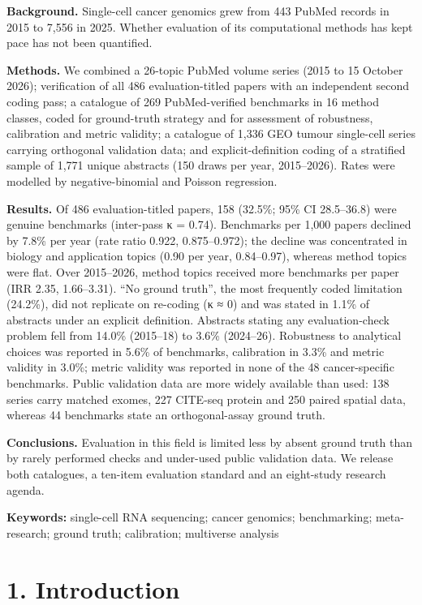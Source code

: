 \documentclass[11pt]{article}
\begin{document}
\textbf{Background.} Single-cell cancer genomics grew from 443 PubMed
records in 2015 to 7,556 in 2025. Whether evaluation of its
computational methods has kept pace has not been quantified.

\textbf{Methods.} We combined a 26-topic PubMed volume series (2015 to
15 October 2026); verification of all 486 evaluation-titled papers with
an independent second coding pass; a catalogue of 269 PubMed-verified
benchmarks in 16 method classes, coded for ground-truth strategy and for
assessment of robustness, calibration and metric validity; a
catalogue of 1,336 GEO tumour single-cell series carrying orthogonal
validation data; and explicit-definition coding of a stratified sample of 1,771 unique abstracts (150 draws per year, 2015--2026). Rates were modelled by
negative-binomial and Poisson regression.

\textbf{Results.} Of 486 evaluation-titled papers, 158 (32.5\%; 95\% CI
28.5--36.8) were genuine benchmarks (inter-pass κ = 0.74). Benchmarks
per 1,000 papers declined by 7.8\% per year (rate ratio 0.922,
0.875--0.972); the decline was concentrated in biology and application
topics (0.90 per year, 0.84--0.97), whereas method topics were flat.
Over 2015--2026, method topics received more benchmarks per paper (IRR
2.35, 1.66--3.31). ``No ground truth'', the most frequently coded
limitation (24.2\%), did not replicate on re-coding (κ ≈ 0) and was
stated in 1.1\% of abstracts under an explicit definition. Abstracts
stating any evaluation-check problem fell from 14.0\% (2015--18) to
3.6\% (2024--26). Robustness to analytical choices was reported in 5.6\%
of benchmarks, calibration in 3.3\% and metric validity in 3.0\%; metric
validity was reported in none of the 48 cancer-specific benchmarks.
Public validation data are more widely available than used: 138 series
carry matched exomes, 227 CITE-seq protein and 250 paired spatial data,
whereas 44 benchmarks state an orthogonal-assay ground truth.

\textbf{Conclusions.} Evaluation in this field is limited less by absent
ground truth than by rarely performed checks and under-used public
validation data. We release both catalogues, a ten-item evaluation
standard and an eight-study research agenda.

\textbf{Keywords:} single-cell RNA sequencing; cancer genomics;
benchmarking; meta-research; ground truth; calibration; multiverse
analysis

\endgroup
\clearpage
\section{1. Introduction}\label{introduction}
\end{document}
